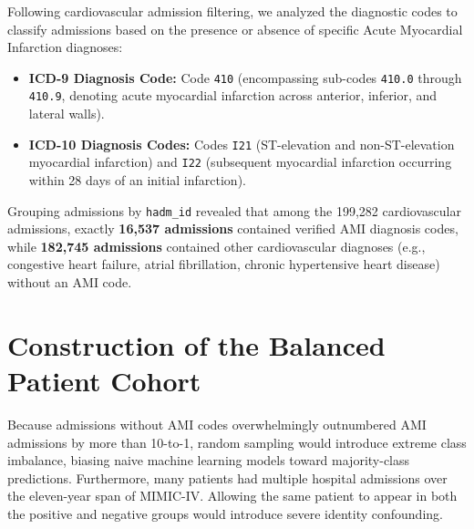 Following cardiovascular admission filtering, we analyzed the diagnostic codes to classify admissions based on the presence or absence of specific Acute Myocardial Infarction diagnoses:
\begin{itemize}
    \item \textbf{ICD-9 Diagnosis Code:} Code \texttt{410} (encompassing sub-codes \texttt{410.0} through \texttt{410.9}, denoting acute myocardial infarction across anterior, inferior, and lateral walls).
    \item \textbf{ICD-10 Diagnosis Codes:} Codes \texttt{I21} (ST-elevation and non-ST-elevation myocardial infarction) and \texttt{I22} (subsequent myocardial infarction occurring within 28 days of an initial infarction).
\end{itemize}

Grouping admissions by \texttt{hadm\_id} revealed that among the 199,282 cardiovascular admissions, exactly \textbf{16,537 admissions} contained verified AMI diagnosis codes, while \textbf{182,745 admissions} contained other cardiovascular diagnoses (e.g., congestive heart failure, atrial fibrillation, chronic hypertensive heart disease) without an AMI code.

\section{Construction of the Balanced Patient Cohort}
\label{sec:cohort_construction}

Because admissions without AMI codes overwhelmingly outnumbered AMI admissions by more than 10-to-1, random sampling would introduce extreme class imbalance, biasing naive machine learning models toward majority-class predictions. Furthermore, many patients had multiple hospital admissions over the eleven-year span of MIMIC-IV. Allowing the same patient to appear in both the positive and negative groups would introduce severe identity confounding.

